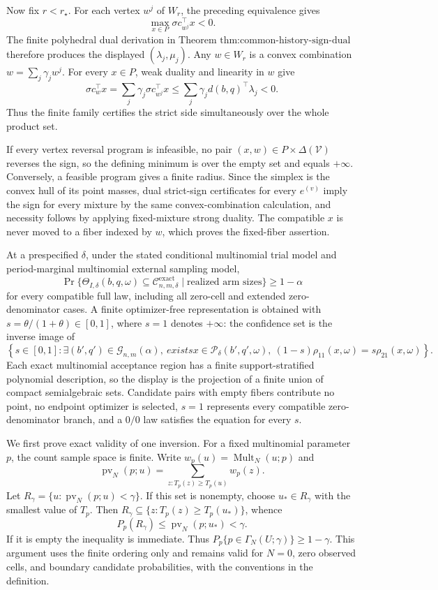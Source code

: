Now fix \(r<r_\star\).  For each vertex \(w^j\) of \(W_r\), the preceding equivalence gives
\[
\max_{x\in P}\sigma c_{w^j}^\top x<0.
\]
The finite polyhedral dual derivation in Theorem \(\text{thm:common-history-sign-dual}\) therefore produces the displayed \((\lambda_j,\mu_j)\).  Any \(w\in W_r\) is a convex combination \(w=\sum_j\gamma_jw^j\).  For every \(x\in P\), weak duality and linearity in \(w\) give
\[
\sigma c_w^\top x
=\sum_j\gamma_j\sigma c_{w^j}^\top x
\leq\sum_j\gamma_jd(b,q)^\top\lambda_j<0.
\]
Thus the finite family certifies the strict side simultaneously over the whole product set.

If every vertex reversal program is infeasible, no pair \((x,w)\in P\times\Delta(\mathcal V)\) reverses the sign, so the defining minimum is over the empty set and equals \(+\infty\).  Conversely, a feasible program gives a finite radius.  Since the simplex is the convex hull of its point masses, dual strict-sign certificates for every \(e^{(v)}\) imply the sign for every mixture by the same convex-combination calculation, and necessity follows by applying fixed-mixture strong duality.  The compatible \(x\) is never moved to a fiber indexed by \(w\), which proves the fixed-fiber assertion.

At a prespecified \(\delta\), under the stated conditional multinomial trial model and period-marginal multinomial external sampling model,
\[
\Pr\{\Theta_{I,\delta}(b,q,\omega)\subseteq
\mathcal C_{n,m,\delta}^{\mathrm{exact}}\mid\text{realized arm sizes}\}\geq1-\alpha
\]
for every compatible full law, including all zero-cell and extended zero-denominator cases.  A finite optimizer-free representation is obtained with \(s=\theta/(1+\theta)\in[0,1]\), where \(s=1\) denotes \(+\infty\): the confidence set is the inverse image of
\[
\left\{s\in[0,1]:\exists(b',q')\in\mathcal G_{n,m}(\alpha),\ exists x\in\mathcal P_\delta(b',q',\omega),\
(1-s)\rho_{11}(x,\omega)=s\rho_{21}(x,\omega)\right\}.
\]
Each exact multinomial acceptance region has a finite support-stratified polynomial description, so the display is the projection of a finite union of compact semialgebraic sets.  Candidate pairs with empty fibers contribute no point, no endpoint optimizer is selected, \(s=1\) represents every compatible zero-denominator branch, and a \(0/0\) law satisfies the equation for every \(s\).

We first prove exact validity of one inversion.  For a fixed multinomial parameter \(p\), the count sample space is finite.  Write \(w_p(u)=\operatorname{Mult}_N(u;p)\) and
\[
\operatorname{pv}_N(p;u)=\sum_{z:T_p(z)\geq T_p(u)}w_p(z).
\]
Let \(R_\gamma=\{u:\operatorname{pv}_N(p;u)<\gamma\}\).  If this set is nonempty, choose \(u_*\in R_\gamma\) with the smallest value of \(T_p\).  Then \(R_\gamma\subseteq\{z:T_p(z)\geq T_p(u_*)\}\), whence
\[
P_p(R_\gamma)\leq\operatorname{pv}_N(p;u_*)<\gamma.
\]
If it is empty the inequality is immediate.  Thus \(P_p\{p\in\Gamma_N(U;\gamma)\}\geq1-\gamma\).  This argument uses the finite ordering only and remains valid for \(N=0\), zero observed cells, and boundary candidate probabilities, with the conventions in the definition.

